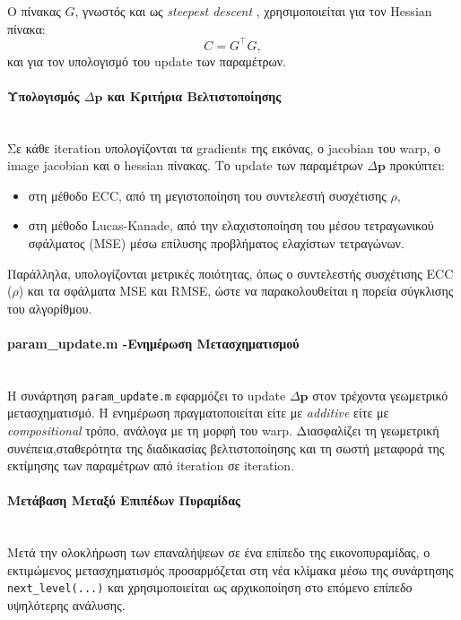 \documentclass[12pt]{article}
\begin{document}
Ο πίνακας \(G\), γνωστός και ως \textit{steepest descent }, χρησιμοποιείται  για τον  Hessian πίνακα:
\[
C = G^{\top} G,
\]
και για τον υπολογισμό του update των παραμέτρων.


\paragraph{Υπολογισμός \(\Delta \mathbf{p}\) και Κριτήρια Βελτιστοποίησης}
\mbox{}\\
Σε κάθε iteration υπολογίζονται τα gradients της εικόνας, ο jacobian του warp, ο image jacobian και ο hessian πίνακας. Το update των παραμέτρων \(\Delta \mathbf{p}\) προκύπτει:
\begin{itemize}
    \item στη μέθοδο ECC, από τη μεγιστοποίηση του συντελεστή συσχέτισης \(\rho\),
    \item στη μέθοδο Lucas-Kanade, από την ελαχιστοποίηση του μέσου τετραγωνικού σφάλματος (MSE) μέσω επίλυσης προβλήματος ελαχίστων τετραγώνων.
\end{itemize}

Παράλληλα, υπολογίζονται μετρικές ποιότητας, όπως ο συντελεστής συσχέτισης ECC (\(\rho\)) και τα σφάλματα MSE και RMSE, ώστε να παρακολουθείται η πορεία σύγκλισης του αλγορίθμου.

\paragraph{param\_update.m -Ενημέρωση Μετασχηματισμού}
\mbox{}\\
Η συνάρτηση \texttt{param\_update.m} εφαρμόζει το update \(\Delta \mathbf{p}\) στον τρέχοντα γεωμετρικό μετασχηματισμό. Η ενημέρωση πραγματοποιείται είτε με \textit{additive} είτε με \textit{compositional} τρόπο, ανάλογα με τη μορφή του warp.
Διασφαλίζει τη γεωμετρική συνέπεια,σταθερότητα της διαδικασίας βελτιστοποίησης και τη σωστή μεταφορά της εκτίμησης των παραμέτρων από iteration σε iteration.

\paragraph{Μετάβαση Μεταξύ Επιπέδων Πυραμίδας}
\mbox{}\\
Μετά την ολοκλήρωση των επαναλήψεων σε ένα επίπεδο της εικονοπυραμίδας, ο εκτιμώμενος μετασχηματισμός προσαρμόζεται στη νέα κλίμακα μέσω της συνάρτησης 
\texttt{next\_level(...)} και χρησιμοποιείται ως αρχικοποίηση στο επόμενο επίπεδο υψηλότερης ανάλυσης.
\end{document}
